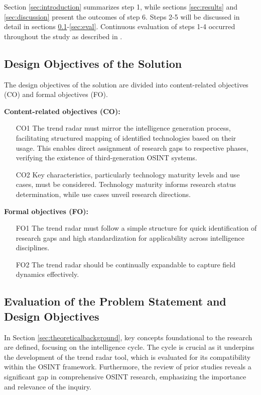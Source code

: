 \documentclass[10pt]{article}
\begin{document}
Section \ref{sec:introduction} summarizes step 1, while sections \ref{sec:results} and \ref{sec:discussion} present the outcomes of step 6. Steps 2-5 will be discussed in detail in sections \ref{sec:designobjectives}-\ref{sec:eval}. Continuous evaluation of steps 1-4 occurred throughout the study as described in \cite{Sonnenberg.2012}.


\subsection{Design Objectives of the Solution} \label{sec:designobjectives}


The design objectives of the solution are divided into content-related objectives (CO) and formal objectives (FO).

\textbf{Content-related objectives (CO):}
\begin{itemize}
    \item[CO1] The trend radar must mirror the intelligence generation process, facilitating structured mapping of identified technologies based on their usage. This enables direct assignment of research gaps to respective phases, verifying the existence of third-generation OSINT systems.
    \item[CO2] Key characteristics, particularly technology maturity levels and use cases, must be considered. Technology maturity informs research status determination, while use cases unveil research directions.
\end{itemize}

\textbf{Formal objectives (FO):}
\begin{itemize}
    \item[FO1] The trend radar must follow a simple structure for quick identification of research gaps and high standardization for applicability across intelligence disciplines.
    \item[FO2] The trend radar should be continually expandable to capture field dynamics effectively.
\end{itemize}

\subsection{Evaluation of the Problem Statement and Design Objectives} 
In Section \ref{sec:theoreticalbackground}, key concepts foundational to the research are defined, focusing on the intelligence cycle. The cycle is crucial as it underpins the development of the trend radar tool, which is evaluated for its compatibility within the OSINT framework. Furthermore, the review of prior studies reveals a significant gap in comprehensive OSINT research, emphasizing the importance and relevance of the inquiry.
\end{document}
